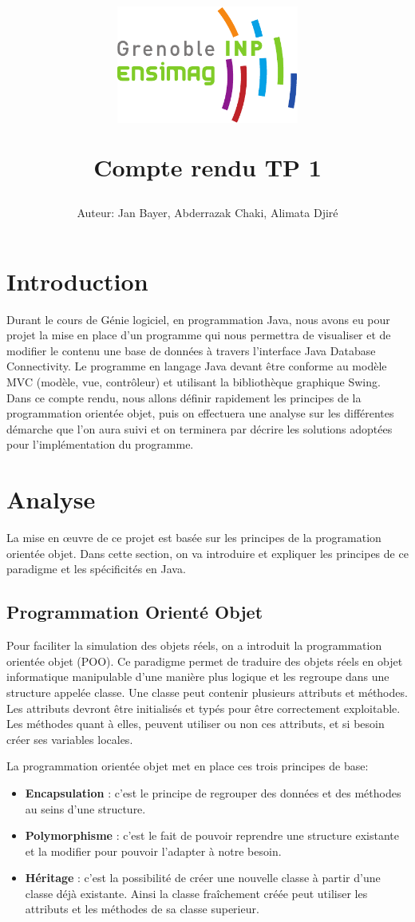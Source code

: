 \documentclass[10pt]{article}
\title{\begin{center}
\includegraphics[width=6cm]{pics/ENSIMAG-eps-converted-to.pdf}
\end{center} \vspace{1cm} Compte rendu TP 1}
\author{Auteur: Jan Bayer, Abderrazak Chaki, Alimata Djiré}
\begin{document}
\maketitle
\newpage
\tableofcontents
\newpage
{}
\section{Introduction}
Durant le cours de Génie logiciel, en programmation Java, nous avons eu pour projet la mise en place d’un programme qui nous permettra de visualiser et de modifier le contenu une base de données à travers l’interface Java Database Connectivity.
Le programme en langage Java devant être conforme au modèle MVC (modèle, vue, contrôleur) et utilisant la bibliothèque graphique Swing.
Dans ce compte rendu, nous allons définir rapidement les principes de la programmation orientée objet, puis on effectuera une analyse sur les différentes démarche que l’on aura suivi et on terminera par décrire les solutions adoptées pour l’implémentation du programme.
\section{Analyse}
La mise en \oe{}uvre de ce projet est basée sur les principes de la programation orientée objet. Dans cette section, on va introduire et expliquer les principes de ce paradigme et les spécificités en Java. 
\subsection{Programmation Orienté Objet}
Pour faciliter la simulation des objets réels, on a introduit la programmation orientée objet (POO). Ce paradigme permet de traduire des objets réels en objet informatique manipulable d’une manière plus logique et les regroupe dans une structure appelée classe. Une classe peut contenir plusieurs attributs et méthodes. Les attributs devront être initialisés et typés pour être correctement exploitable. Les méthodes quant à elles, peuvent utiliser ou non ces attributs, et si besoin créer ses variables locales.

La programmation orientée objet met en place ces trois principes de base:
\begin{itemize}
    \item \textbf{Encapsulation} : c’est le principe de regrouper des données et des méthodes au seins d’une structure.
    \item \textbf{Polymorphisme} : c’est le fait de pouvoir reprendre une structure existante et la modifier pour pouvoir l’adapter à notre besoin.
    \item \textbf{Héritage} : c’est la possibilité de créer une nouvelle classe à partir d’une classe déjà existante. Ainsi la classe fraîchement créée peut utiliser les attributs et les méthodes de sa  classe superieur.
\end{itemize}
\end{document}
